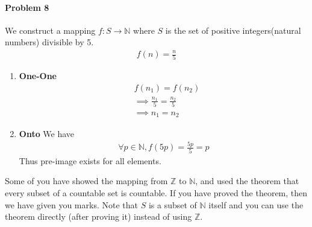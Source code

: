\documentclass[12pt]{scrartcl}
\begin{document}
\paragraph*{Problem 8}
We construct a mapping $f:S \rightarrow \mathbb{N}$ where $S$ is the set of positive integers(natural numbers) divisible by 5.
\begin{align*}
    f(n) = \frac{n}{5}
\end{align*}
\begin{enumerate}
    \item \textbf{One-One}
    \\ \begin{align*}
        & f(n_1) = f(n_2)
        \\  &\implies \frac{n_1}{5} = \frac{n_2}{5}
        \\ & \implies n_1 = n_2
    \end{align*}
    \item \textbf{Onto}
    We have \begin{align*}
        \forall p \in \mathbb{N}, f(5p) = \frac{5p}{5} = p
    \end{align*}
    Thus pre-image exists for all elements.
\end{enumerate}
Some of you have showed the mapping from  $\mathbb{Z}$ to $\mathbb{N}$, and used the theorem that every subset of a countable set is countable. If you have proved the theorem, then we have given you marks. Note that $S$ is a subset of $\mathbb{N}$ itself and you can use the theorem directly (after proving it) instead of using  $\mathbb{Z}$.
\end{document}
